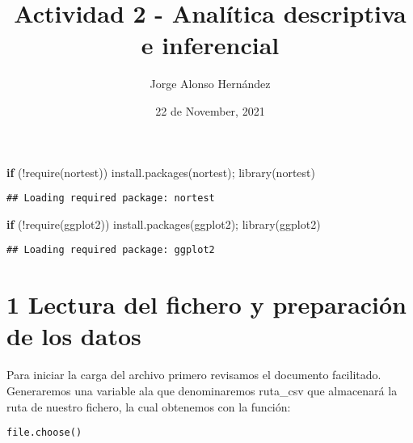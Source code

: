 \documentclass[
  a4paper]{article}
\title{Actividad 2 - Analítica descriptiva e inferencial}
\author{Jorge Alonso Hernández}
\date{22 de November, 2021}
\newenvironment{Shaded}{\begin{snugshade}}{\end{snugshade}}
\newcommand{\ControlFlowTok}[1]{\textcolor[rgb]{0.13,0.29,0.53}{\textbf{#1}}}
\newcommand{\FunctionTok}[1]{\textcolor[rgb]{0.00,0.00,0.00}{#1}}
\newcommand{\NormalTok}[1]{#1}
\newcommand{\SpecialCharTok}[1]{\textcolor[rgb]{0.00,0.00,0.00}{#1}}
\newcommand{\StringTok}[1]{\textcolor[rgb]{0.31,0.60,0.02}{#1}}
\begin{document}
\maketitle

{
\setcounter{tocdepth}{2}
\tableofcontents
}
\begin{Shaded}
\begin{Highlighting}[]
\ControlFlowTok{if}\NormalTok{ (}\SpecialCharTok{!}\FunctionTok{require}\NormalTok{(}\StringTok{\textquotesingle{}nortest\textquotesingle{}}\NormalTok{)) }\FunctionTok{install.packages}\NormalTok{(}\StringTok{\textquotesingle{}nortest\textquotesingle{}}\NormalTok{); }\FunctionTok{library}\NormalTok{(}\StringTok{\textquotesingle{}nortest\textquotesingle{}}\NormalTok{)}
\end{Highlighting}
\end{Shaded}

\begin{verbatim}
## Loading required package: nortest
\end{verbatim}

\begin{Shaded}
\begin{Highlighting}[]
\ControlFlowTok{if}\NormalTok{ (}\SpecialCharTok{!}\FunctionTok{require}\NormalTok{(}\StringTok{\textquotesingle{}ggplot2\textquotesingle{}}\NormalTok{)) }\FunctionTok{install.packages}\NormalTok{(}\StringTok{\textquotesingle{}ggplot2\textquotesingle{}}\NormalTok{); }\FunctionTok{library}\NormalTok{(}\StringTok{\textquotesingle{}ggplot2\textquotesingle{}}\NormalTok{)}
\end{Highlighting}
\end{Shaded}

\begin{verbatim}
## Loading required package: ggplot2
\end{verbatim}

\hypertarget{lectura-del-fichero-y-preparaciuxf3n-de-los-datos}{%
\section{1 Lectura del fichero y preparación de los
datos}\label{lectura-del-fichero-y-preparaciuxf3n-de-los-datos}}

Para iniciar la carga del archivo primero revisamos el documento
facilitado. Generaremos una variable ala que denominaremos ruta\_csv que
almacenará la ruta de nuestro fichero, la cual obtenemos con la función:

\begin{verbatim}
file.choose()
\end{verbatim}
\end{document}
